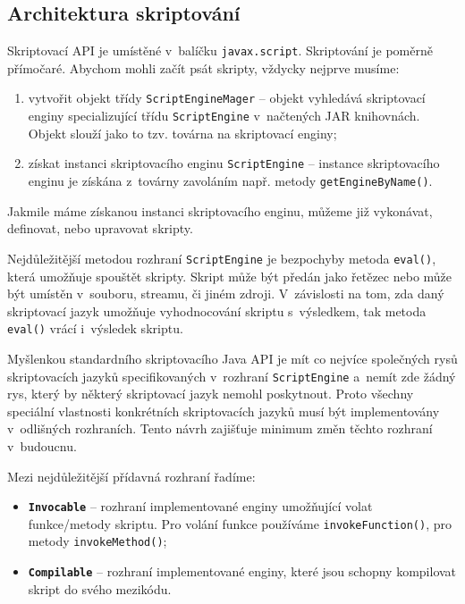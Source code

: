 \subsection{Architektura skriptování}
\label{Chapter.JavaScriptInJavaAnalysis.ScriptingJavaAPI.ArchitectureOfScripting}

\bigskip \noindent Skriptovací API je umístěné v~balíčku \texttt{javax.script}. Skriptování je poměrně přímočaré. Abychom mohli začít psát skripty, vždycky nejprve musíme:

\begin{enumerate}
  \item vytvořit objekt třídy \texttt{ScriptEngineMager} -- objekt vyhledává skriptovací enginy specializující třídu \texttt{ScriptEngine} v~načtených JAR knihovnách. Objekt slouží jako to tzv. továrna na skriptovací enginy;
  \item získat instanci skriptovacího enginu \texttt{ScriptEngine} -- instance skriptovacího enginu je získána z~továrny zavoláním např. metody \texttt{getEngineByName()}. 
\end{enumerate}

Jakmile máme získanou instanci skriptovacího enginu, můžeme již vykonávat, definovat, nebo upravovat skripty.

Nejdůležitější metodou rozhraní \texttt{ScriptEngine} je bezpochyby metoda \texttt{eval()}, která umožňuje spouštět skripty. Skript může být předán jako řetězec nebo může být umístěn v~souboru, streamu, či jiném zdroji. V~závislosti na tom, zda daný skriptovací jazyk umožňuje vyhodnocování skriptu s~výsledkem, tak metoda \texttt{eval()} vrácí i~výsledek skriptu.

Myšlenkou standardního skriptovacího Java API je mít co nejvíce společných rysů skriptovacích jazyků specifikovaných v~rozhraní \texttt{ScriptEngine} a~nemít zde žádný rys, který by některý skriptovací jazyk nemohl poskytnout. Proto všechny speciální vlastnosti konkrétních skriptovacích jazyků musí být implementovány v~odlišných rozhraních. Tento návrh zajišťuje minimum změn těchto rozhraní v~budoucnu. 

\bigskip \noindent Mezi nejdůležitější přídavná rozhraní řadíme:

\begin{itemize}
  \item \textbf{\texttt{Invocable}} -- rozhraní implementované enginy umožňující volat funkce/metody skriptu. Pro volání funkce používáme \texttt{invokeFunction()}, pro metody \texttt{invokeMethod()};
  \item \textbf{\texttt{Compilable}} -- rozhraní implementované enginy, které jsou schopny kompilovat skript do svého mezikódu.
\end{itemize}

